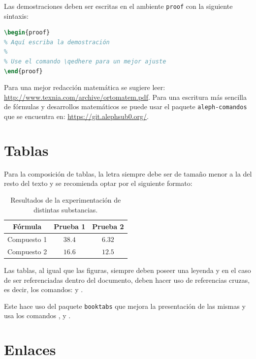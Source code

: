 \documentclass{aleph-revista}
\begin{document}
Las demostraciones deben ser escritas en el ambiente \texttt{proof} con la siguiente sintaxis:

\begin{lstlisting}[language=TeX]
\begin{proof}
% Aquí escriba la demostración
%
% Use el comando \qedhere para un mejor ajuste
\end{proof}
\end{lstlisting}

Para una mejor redacción matemática se sugiere leer: \url{http://www.texnia.com/archive/ortomatem.pdf}. Para una escritura más sencilla de fórmulas y desarrollos matemáticos se puede usar el paquete \texttt{aleph-comandos} que se encuentra en: \url{https://git.alephsub0.org/}. 

\section{Tablas}

Para la composición de tablas, la letra siempre debe ser de tamaño menor a la del resto del texto y se recomienda optar por el siguiente formato:

\begin{table}[H]
    \centering\small
    \begin{tabular}{ccc}
    \toprule
        \textbf{Fórmula} & \textbf{Prueba 1} & \textbf{Prueba 2} \\ 
    \midrule
        Compuesto 1 & $38.4$  &  $6.32$\\ 
        Compuesto 2 & $16.6$ & $12.5$ \\ 
    \bottomrule
    \end{tabular}
    \label{tab:01}
    \caption{Resultados de la experimentación de distintas substancias.}
\end{table}

Las tablas, al igual que las figuras, siempre deben poseer una leyenda y en el caso de ser referenciadas dentro del documento, deben hacer uso de referencias cruzas, es decir, los comandos: \verb@{} y \verb@{}.


Este hace uso del paquete \texttt{booktabs} que mejora la presentación de las mismas y usa los comandos \verb@\toprule@, \verb@\midrule@ y \verb@\bottomrule@.

\section{Enlaces}
\end{document}
